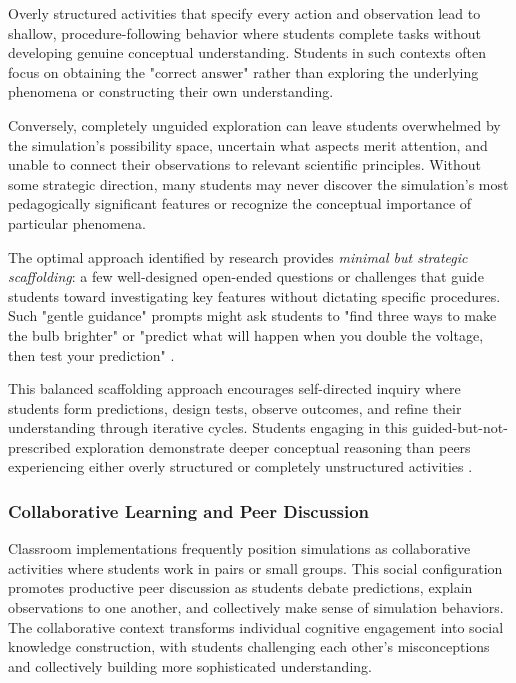 Overly structured activities that specify every action and observation lead to shallow, procedure-following behavior where students complete tasks without developing genuine conceptual understanding. Students in such contexts often focus on obtaining the "correct answer" rather than exploring the underlying phenomena or constructing their own understanding.

Conversely, completely unguided exploration can leave students overwhelmed by the simulation's possibility space, uncertain what aspects merit attention, and unable to connect their observations to relevant scientific principles. Without some strategic direction, many students may never discover the simulation's most pedagogically significant features or recognize the conceptual importance of particular phenomena.

The optimal approach identified by research provides \textit{minimal but strategic scaffolding}: a few well-designed open-ended questions or challenges that guide students toward investigating key features without dictating specific procedures. Such "gentle guidance" prompts might ask students to "find three ways to make the bulb brighter" or "predict what will happen when you double the voltage, then test your prediction" \cite{phet2023}.

This balanced scaffolding approach encourages self-directed inquiry where students form predictions, design tests, observe outcomes, and refine their understanding through iterative cycles. Students engaging in this guided-but-not-prescribed exploration demonstrate deeper conceptual reasoning than peers experiencing either overly structured or completely unstructured activities \cite{phet2023}.

\subsubsection{Collaborative Learning and Peer Discussion}

Classroom implementations frequently position simulations as collaborative activities where students work in pairs or small groups. This social configuration promotes productive peer discussion as students debate predictions, explain observations to one another, and collectively make sense of simulation behaviors. The collaborative context transforms individual cognitive engagement into social knowledge construction, with students challenging each other's misconceptions and collectively building more sophisticated understanding.

